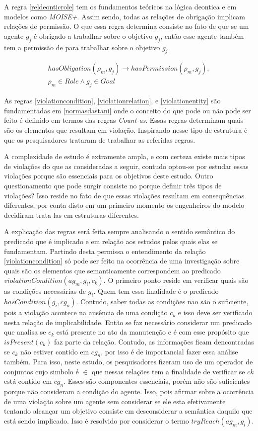 A regra \ref{reldeonticrole} tem os fundamentos teóricos na lógica deontica e em modelos como \textit{MOISE+}. Assim sendo, todas as relações de obrigação
implicam relações de permissão. O que essa regra determina consiste no fato de que se um agente $g_j$ é obrigado a trabalhar sobre o objetivo $g_j$, 
então esse agente também tem a permissão de para trabalhar sobre o objetivo $g_j$ 

\begin{eqnarray}\label{reldeonticrole}
	hasObligation(\rho_m,g_j) \to hasPermission(\rho_m,g_j), \nonumber \\
    \rho_m \in Role \wedge g_j \in Goal
\end{eqnarray}

As regras \ref{violationcondition}, \ref{violationrelation}, e \ref{violationentity} são fundamentadas em \ref{normasdastani} onde o conceito do que 
pode ou não pode ser feito é definido em termos das regras \textit{Count-as}. Essas regras determinam quais são os elementos que resultam em violação. 
Inspirando nesse tipo de estrutura é que os pesquisadores trataram de trabalhar as referidas regras. 

A complexidade de estudo é extramente ampla, e com certeza existe mais tipos de violações do que as consideradas a seguir, contudo optou-se por estudar essas 
violações porque são essenciais para os objetivos deste estudo. Outro questionamento que pode surgir consiste no porque definir três tipos de violações? 
Isso reside no fato de que essas violações resultam em consequências diferentes, por conta disto em um primeiro momento os engenheiros do modelo decidiram 
trata-las em estruturas diferentes. 

A explicação das regras será feita sempre analisando o sentido semântico do predicado que é implicado e em relação aos estudos pelos quais elas se fundamentam. 
Partindo desta permissa o entendimento da relação \ref{violationcondition} só pode ser feito na ocorrência de uma  investigação sobre quais são os elementos 
que semanticamente correspondem ao predicado $violationCondition(ag_m,g_i,c_k)$. O primeiro ponto reside em verificar quais são as condições necessárias
de $g_i$. Quem tem essa finalidade é o predicado $hasCondition(g_i,cg_n)$. Contudo, saber todas as condições nao são o suficiente, pois a violação 
acontece na ausência de uma condição $c_k$ e isso deve ser verificado nesta relação de implicabilidade. Então se faz necessário considerar um predicado 
que analisa se $c_k$ está presente no ato da manutenção e é com esse propósito que $isPresent(c_k)$ faz parte da relação. Contudo, as informações
ficam dencontradas se $c_k$ não estiver contido em $cg_n$, por isso é de importancial fazer essa análise também. Para isso, neste estudo, os pesquisadores
fizeram uso de um operador de conjuntos cujo simbolo é $\in$ que nessas relações tem a finalidade de verificar se $ck$ está contido em $cg_n$. Esses são
componentes essenciais, porém não são suficientes porque não consideram a condição do agente. Isso, pois afirmar sobre a ocorrência de uma violação sobre 
um agente sem considerar se ele esta efetivamente tentando alcançar um objetivo consiste em desconsiderar a semântica daquilo que está sendo implicado. 
Isso é resolvido por considerar o termo  $tryReach(ag_m,g_i)$. 

